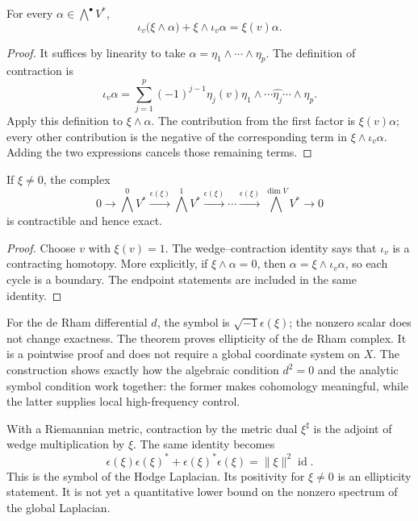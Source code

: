 \begin{lemma}
For every $\alpha\in\bigwedge^\bullet V^*$,
\[
\iota_v\bigl(\xi\wedge\alpha\bigr)
+\xi\wedge\iota_v\alpha=\xi(v)\alpha.
\]
\end{lemma}
\begin{proof}
It suffices by linearity to take $\alpha=\eta_1\wedge\cdots\wedge\eta_p$. The definition of contraction is
\[
\iota_v\alpha=\sum_{j=1}^p(-1)^{j-1}\eta_j(v)
 \eta_1\wedge\cdots\widehat{\eta_j}\cdots\wedge\eta_p.
\]
Apply this definition to $\xi\wedge\alpha$. The contribution from the first factor is $\xi(v)\alpha$; every other contribution is the negative of the corresponding term in $\xi\wedge\iota_v\alpha$. Adding the two expressions cancels those remaining terms.
\end{proof}

\begin{theorem}
If $\xi\neq0$, the complex
\[
0\to\bigwedge^0V^*\xrightarrow{\epsilon(\xi)}\bigwedge^1V^*
 \xrightarrow{\epsilon(\xi)}\cdots
 \xrightarrow{\epsilon(\xi)}\bigwedge^{\dim V}V^*\to0
\]
is contractible and hence exact.
\end{theorem}
\begin{proof}
Choose $v$ with $\xi(v)=1$. The wedge--contraction identity says that $\iota_v$ is a contracting homotopy. More explicitly, if $\xi\wedge\alpha=0$, then $\alpha=\xi\wedge\iota_v\alpha$, so each cycle is a boundary. The endpoint statements are included in the same identity.
\end{proof}

For the de Rham differential $d$, the symbol is $\sqrt{-1}\epsilon(\xi)$; the nonzero scalar does not change exactness. The theorem proves ellipticity of the de Rham complex. It is a pointwise proof and does not require a global coordinate system on $X$. The construction shows exactly how the algebraic condition $d^2=0$ and the analytic symbol condition work together: the former makes cohomology meaningful, while the latter supplies local high-frequency control.

With a Riemannian metric, contraction by the metric dual $\xi^\sharp$ is the adjoint of wedge multiplication by $\xi$. The same identity becomes
\[
\epsilon(\xi)\epsilon(\xi)^*
+\epsilon(\xi)^*\epsilon(\xi)
=\|\xi\|^2\operatorname{id}.
\]
This is the symbol of the Hodge Laplacian. Its positivity for $\xi\neq0$ is an ellipticity statement. It is not yet a quantitative lower bound on the nonzero spectrum of the global Laplacian.

